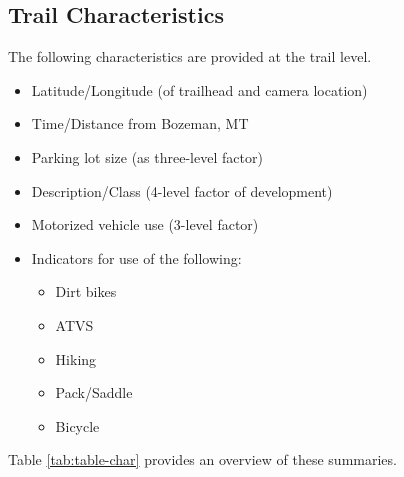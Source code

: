 \documentclass[
]{book}
\providecommand{\tightlist}{%
  \setlength{\itemsep}{0pt}\setlength{\parskip}{0pt}}
\begin{document}
\hypertarget{trail-characteristics}{%
\subsection{Trail Characteristics}\label{trail-characteristics}}

The following characteristics are provided at the trail level.

\begin{itemize}
\tightlist
\item
  Latitude/Longitude (of trailhead and camera location)
\item
  Time/Distance from Bozeman, MT
\item
  Parking lot size (as three-level factor)
\item
  Description/Class (4-level factor of development)
\item
  Motorized vehicle use (3-level factor)
\item
  Indicators for use of the following:

  \begin{itemize}
  \tightlist
  \item
    Dirt bikes
  \item
    ATVS
  \item
    Hiking
  \item
    Pack/Saddle
  \item
    Bicycle
  \end{itemize}
\end{itemize}

Table \ref{tab:table-char} provides an overview of these summaries.
\end{document}
